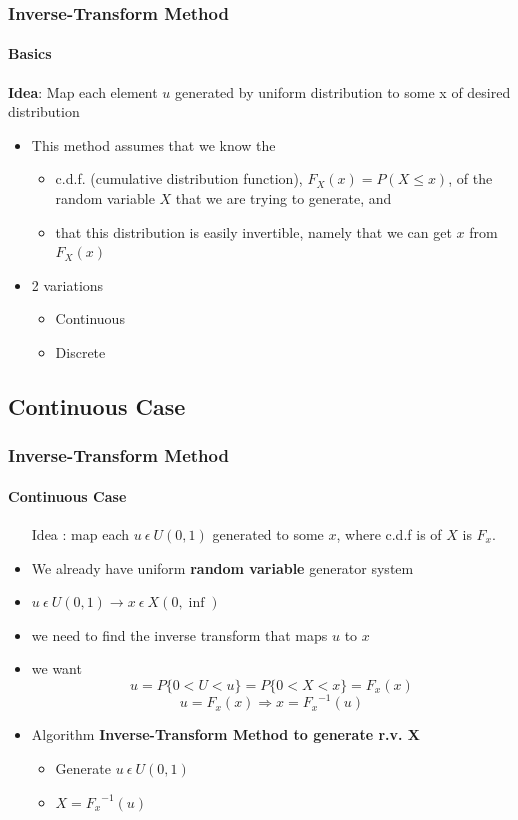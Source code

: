 \documentclass{beamer}
\begin{document}
\begin{frame}
    \frametitle{Inverse-Transform Method}
    \framesubtitle{Basics}
    \textbf{Idea}: Map each element $u$ generated by uniform distribution to some x of desired distribution
	\begin{itemize}
		\item This method assumes that we know the
		\begin{itemize}
		\item c.d.f. (cumulative distribution function), $F_X (x) = P( X \leq 				x)$, of the random variable $X$ that we are trying to generate, and
		\item that this distribution is easily invertible, namely that we can 				get $x$ from $F_X (x)$
		\end{itemize}
		\item 2 variations
		\begin{itemize}
		\item Continuous
		\item Discrete
		\end{itemize}
		
		  
	\end{itemize}	

\end{frame}

\subsection{Continuous Case}


\begin{frame}
    \frametitle{Inverse-Transform Method}
    \framesubtitle{Continuous Case}
	\begin{itemize}
		\item [Idea]: map each $u \: \epsilon \: U(0,1)$ generated to some $x$, 				where c.d.f is of $X$ is $F_x$.
		\item We already have uniform \textbf{random variable} generator system  
		\item $u \: \epsilon \: U(0,1) \rightarrow x \: \epsilon \: X(0,\inf) $
		\item we need to find the inverse transform that maps $u$ to $x$
		\item we want 
		\begin{equation}
		u =P\{0<U<u\} = P\{0<X<x\} = F_x(x) 
		\end{equation}
		\begin{equation}
		u = F_x(x) \Longrightarrow x = {{F}_{x}}^{-1}(u)
		\end{equation}
		\item Algorithm \textbf{Inverse-Transform Method to generate r.v. X}
		\begin{itemize}
		\item Generate  $u \: \epsilon \: U(0,1)$
		\item $X = {{F}_{x}}^{-1}(u)$
		\end{itemize}
		  
	\end{itemize}	

\end{frame}
\end{document}
